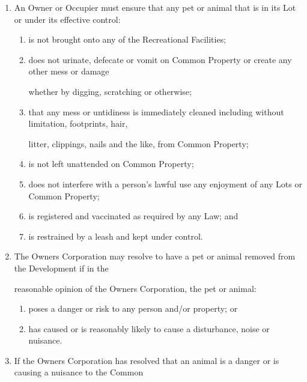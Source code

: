 \documentclass{article}
\begin{document}
\begin{enumerate}[label=\arabic*.]
\begin{enumerate}[label=\arabic{enumi}.\arabic*.]
\begin{enumerate}[label=(\arabic*)]
\item  An Owner or Occupier must ensure that any pet or animal that is in its Lot or under its effective control: 

\begin{enumerate}[label=(\alph*)]
\item  is not brought onto any of the Recreational Facilities; 

\item  does not urinate, defecate or vomit on Common Property or create any other mess or damage 

whether by digging, scratching or otherwise; 

\item  that any mess or untidiness is immediately cleaned including without limitation, footprints, hair, 

litter, clippings, nails and the like,  from Common Property; 

\item  is not left unattended on Common Property; 

\item  does not interfere with a person’s lawful use any enjoyment of any Lots or Common Property; 

\item  is registered and vaccinated as required by any Law; and 

\item  is restrained by a leash and kept under control. 

\end{enumerate}
\item  The Owners Corporation may resolve to have a pet or animal removed from the Development if in the 

reasonable opinion of the Owners Corporation, the pet or animal: 

\newpage

\begin{enumerate}[label=(\alph*)]
\item  poses a danger or risk to any person and/or property; or 

\item  has caused or is reasonably likely to cause a disturbance, noise or nuisance. 

\end{enumerate}
\item  If the Owners Corporation has resolved that an animal is a danger or is causing a nuisance to the Common 


\end{enumerate}
\end{enumerate}
\end{enumerate}
\end{document}
